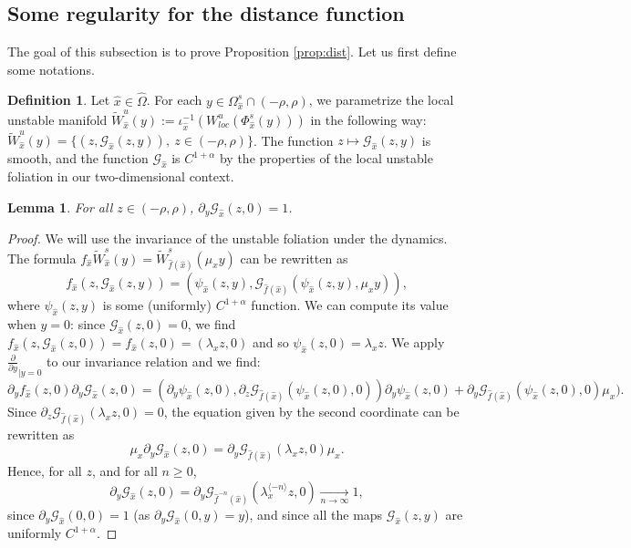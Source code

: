 \documentclass[a4paper]{article}
\newtheorem{lemma}[theorem]{Lemma}
\theoremstyle{definition}
\newtheorem{definition}{Definition}[section]
\begin{document}
\subsection{Some regularity for the distance function}

The goal of this subsection is to prove Proposition \ref{prop:dist}. Let us first define some notations.

\begin{definition}
Let ${\widehat{x}} \in \widehat{\Omega}$. For each $y \in \Omega_{\widehat{x}}^s \cap (-\rho,\rho)$, we parametrize the local unstable manifold $\widetilde{W}^u_{{\widehat{x}}}(y) := \iota_{\widehat{x}}^{-1}(W^u_{loc}(\Phi_{\widehat{x}}^s(y)))$ in the following way: $\widetilde{W}^u_{{\widehat{x}}}(y) = \{ (z,\mathcal{G}_{\widehat{x}}(z,y)), \ z \in (-\rho,\rho) \}$.
The function $z \mapsto \mathcal{G}_{\widehat{x}}(z,y)$ is smooth, and the function $\mathcal{G}_{\widehat{x}}$ is $C^{1+\alpha}$ by the properties of the local unstable foliation in our two-dimensional context.
\end{definition}

\begin{lemma}
For all $z \in (-\rho,\rho)$, $\partial_y \mathcal{G}_{\widehat{x}}(z,0) = 1$.
\end{lemma}

\begin{proof}
We will use the invariance of the unstable foliation under the dynamics. The formula $f_{\widehat{x}} \widetilde{W}_{\widehat{x}}^s(y) = \widetilde{W}_{\widehat{f}({\widehat{x}})}^s( \mu_x y )$ can be rewritten as
$$ f_{\widehat{x}}(z,\mathcal{G}_{\widehat{x}}(z,y)) = ( \psi_{\widehat{x}}(z,y), \mathcal{G}_{\widehat{f}({\widehat{x}})}(\psi_{\widehat{x}}(z,y),\mu_x y) ) ,$$
where $\psi_{\widehat{x}}(z,y)$ is some (uniformly) $C^{1+\alpha}$ function. We can compute its value when $y=0$: since $\mathcal{G}_{\widehat{x}}(z,0) = 0$, we find $f_{\widehat{x}}(z,\mathcal{G}_{\widehat{x}}(z,0)) = f_{\widehat{x}}(z,0) = (\lambda_x z,0)$ and so $\psi_{\widehat{x}}(z,0) = \lambda_x z$. We apply $\frac{\partial}{\partial y}_{|y=0}$ to our invariance relation and we find:
$$ \partial_y f_{\widehat{x}}(z,0) \partial_y \mathcal{G}_{\widehat{x}}(z,0) = ( \partial_y \psi_{\widehat{x}}(z,0), \partial_z \mathcal{G}_{\widehat{f}({\widehat{x}})}(\psi_{\widehat{x}}(z,0),0) ) \partial_y \psi_{\widehat{x}}(z,0) + \partial_y \mathcal{G}_{\widehat{f}({\widehat{x}})}(\psi_{\widehat{x}}(z,0),0)  \mu_x ). $$
Since $\partial_z \mathcal{G}_{\widehat{f}({\widehat{x}})}(\lambda_x z,0) = 0$, the equation given by the second coordinate can be rewritten as
$$ \mu_x \partial_y \mathcal{G}_{\widehat{x}}(z,0) = \partial_y \mathcal{G}_{\widehat{f}({\widehat{x}})}(\lambda_x z,0) \mu_x .$$
Hence, for all $z$, and for all $n \geq 0$, $$ \partial_y \mathcal{G}_{\widehat{x}}(z,0) = \partial_y \mathcal{G}_{\widehat{f}^{-n}({\widehat{x}})}( \lambda_x^{\langle -n \rangle} z,0) \underset{n \rightarrow \infty}{\longrightarrow} 1, $$ 
since $\partial_y \mathcal{G}_{\widehat{x}}(0,0) = 1$ (as $\partial_y \mathcal{G}_{\widehat{x}}(0,y) = y$), and since all the maps $\mathcal{G}_{\widehat{x}}(z,y)$ are uniformly $C^{1+\alpha}$.
\end{proof}
\end{document}
